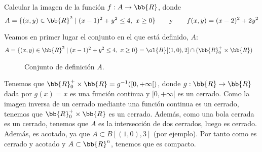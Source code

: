 \begin{ejercicio}
    Calcular la imagen de la función $f: A \to \bb{R}$, donde
    \begin{equation*}
        A = \{(x,y)\in \bb{R}^2\mid (x-1)^2+y^2\leq 4,~x\geq 0\}
        \qquad \text{y} \qquad
        f(x,y)=(x-2)^2+2y^2
    \end{equation*}

    Veamos en primer lugar el conjunto en el que está definido, $A$:
    \begin{equation*}
        \begin{split}
            A &= \{(x,y)\in \bb{R}^2\mid (x-1)^2+y^2\leq 4,~x\geq 0\}
            = \ol{B}[(1,0),2]\cap (\bb{R}^+_0\times \bb{R})
        \end{split}
    \end{equation*}
    \begin{figure}[H]
        \centering
            
        \caption{Conjunto de definición $A$.}
    \end{figure}

    
    Tenemos que $\bb{R}^+_0\times \bb{R}=g^{-1}([0,+\infty[)$, donde $g:\bb{R}\to \bb{R}$ dada por $g(x)=x$ es una función continua y $[0,+\infty[$ es un cerrado. Como la imagen inversa de un cerrado mediante una función continua es un cerrado, tenemos que $\bb{R}^+_0\times \bb{R}$ es un cerrado. Además, como una bola cerrada es un cerrado, tenemos que $A$ es la intersección de dos cerrados, luego es cerrado. Además, es acotado, ya que $A\subset B[(1,0), 3]$ (por ejemplo). Por tanto como es cerrado y acotado y $A\subset \bb{R}^n$, tenemos que es compacto. 


\end{ejercicio}
